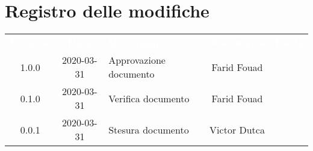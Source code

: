 \section*{Registro delle modifiche}
{
	\centering
	\begin{longtable}{ c c  C{4cm}  c  c }
		\textcolor{white}{\textbf{Versione}} & \textcolor{white}{\textbf{Data}} & \textcolor{white}{\textbf{Descrizione}} & \textcolor{white}{\textbf{Nominativo}} & \textcolor{white}{\textbf{Ruolo}}\\	
		1.0.0 & 2020-03-31 & Approvazione documento & Farid Fouad &\RdP{}\\	
		0.1.0 & 2020-03-31 & Verifica documento & Farid Fouad &\ver{}\\		
		0.0.1 & 2020-03-31 & Stesura documento & Victor Dutca &\reda{}\\		
		
	\end{longtable}

}